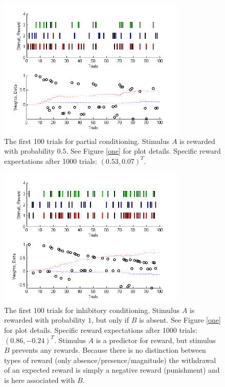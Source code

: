 \documentclass{scrartcl}
\begin{document}
\begin{figure}
\centering
\includegraphics[trim = {0.8cm 0 0.5cm 0.2cm}, width=0.8\textwidth, clip]{../pics/two}
\caption{The first 100 trials for partial conditioning. Stimulus $A$ is rewarded with probability $0.5$. See Figure \ref{one} for plot details. Specific reward expectations after 1000 trials: $(0.53, 0.07)^T$.}
\label{two}
\end{figure}

\begin{figure}
\centering
\includegraphics[trim = {0.8cm 0 0.5cm 0.2cm}, width=0.8\textwidth, clip]{../pics/three}
\caption{The first 100 trials for inhibitory conditioning. Stimulus $A$ is rewarded with probability $1$, but only if $B$ is absent. See Figure \ref{one} for plot details. Specific reward expectations after 1000 trials: $(0.86, -0.24)^T$. Stimulus $A$ is a predictor for reward, but stimulus $B$ prevents any rewards. Because there is no distinction between types of reward (only absence/presence/magnitude) the withdrawal of an expected reward is simply a negative reward (punishment) and is here associated with $B$.}
\label{three}
\end{figure}
\end{document}
